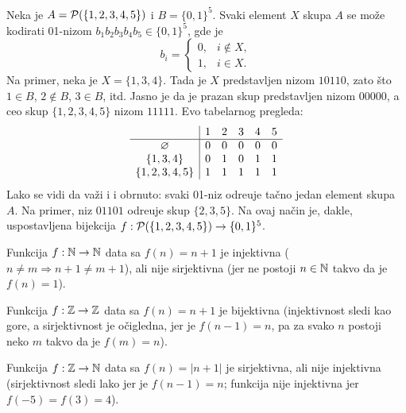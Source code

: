 \begin{EX}
  Neka je $A = \mathcal{P}(\{1, 2, 3, 4, 5\})$ i $B = \{0,1\}^5$.
  Svaki element $X$ skupa $A$ se mo\v ze kodirati 01-nizom $b_1 b_2 b_3 b_4 b_5 \in \{0, 1\}^5$,
  gde je
  $$
    b_i = \begin{cases}
      0, & i \notin X,\\
      1, & i \in X.
    \end{cases}
  $$
  Na primer, neka je $X = \{1, 3, 4\}$. Tada je $X$ predstavljen nizom $10110$,
  zato \v sto $1 \in B$, $2 \notin B$, $3 \in B$, itd. Jasno je da je prazan skup predstavljen nizom $00000$,
  a ceo skup $\{1, 2, 3, 4, 5\}$ nizom $11111$. Evo tabelarnog pregleda:
  $$
    \begin{array}{c|ccccc}
                          & 1 & 2 & 3 & 4 & 5 \\ \hline
      {\varnothing               } & 0 & 0 & 0 & 0 & 0 \\
      {\{1, 3, 4\}      } & 0 & 1 & 0 & 1 & 1 \\
      {\{1, 2, 3, 4, 5\}} & 1 & 1 & 1 & 1 & 1 
    \end{array}
  $$
  Lako se vidi da va\v zi i i obrnuto: svaki 01-niz odre\dj uje ta\v cno jedan element skupa $A$. Na primer,
  niz $01101$ odre\dj uje skup $\{2, 3, 5\}$. Na ovaj na\v cin je, dakle, uspostavljena bijekcija
  $f : \mathcal{P}(\{1, 2, 3, 4, 5\}) \to \{0,1\}^5$.
\end{EX}

\begin{EX}
  Funkcija $f : \mathbb{N} \to \mathbb{N}$ data sa $f(n) = n + 1$ je injektivna ($n \ne m \Rightarrow n + 1 \ne m + 1$),
  ali nije sirjektivna (jer ne postoji $n \in \mathbb{N}$ takvo da je $f(n) = 1$).

  Funkcija $f : \mathbb{Z} \to \mathbb{Z}$ data sa $f(n) = n + 1$ je bijektivna (injektivnost sledi kao gore, a sirjektivnost je o\v cigledna,
  jer je $f(n - 1) = n$, pa za svako $n$ postoji neko $m$ takvo da je $f(m) = n$).

  Funkcija $f : \mathbb{Z} \to \mathbb{N}$ data sa $f(n) = |n + 1|$ je sirjektivna, ali nije injektivna
  (sirjektivnost sledi lako jer je $f(n - 1) = n$; funkcija nije injektivna jer $f(-5) = f(3) = 4$).
\end{EX}

